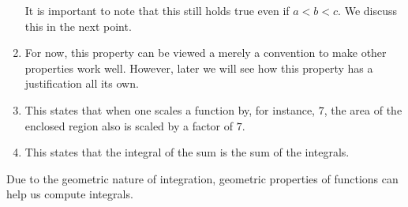 \documentclass{ximera}
\begin{document}
\begin{theorem}
\begin{explanation}
\begin{enumerate}
\begin{image}
  \end{image}		
  It is important to note that this still holds true even if
  $a<b<c$. We discuss this in the next point.
  
\item For now, this property can be viewed a merely a convention to
  make other properties work well. However, later we will see how this
  property has a justification all its own.

\item This states that when one scales a function by, for instance, $7$,
  the area of the enclosed region also is scaled by a factor of
  $7$.
\item This states that the integral of the sum is the sum of the
  integrals.
\end{enumerate}
\end{explanation}
\end{theorem}

Due to the geometric nature of integration, geometric properties of
functions can help us compute integrals.
\end{document}
